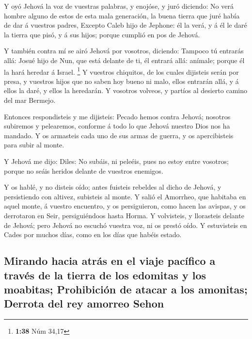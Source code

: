  Y oyó Jehová la voz de vuestras palabras, y enojóse, y
juró diciendo:  No verá hombre alguno de estos de esta mala
generación, la buena tierra que juré había de dar á vuestros padres,
 Excepto Caleb hijo de Jephone: él la verá, y á él le daré
la tierra que pisó, y á sus hijos; porque cumplió en pos de Jehová.

 Y también contra mí se airó Jehová por vosotros, diciendo:
Tampoco tú entrarás allá:  Josué hijo de Nun, que está
delante de ti, él entrará allá: anímale; porque él la hará heredar á
Israel. \footnote{\textbf{1:38} Núm 34,17}  Y vuestros
chiquitos, de los cuales dijisteis serán por presa, y vuestros hijos que
no saben hoy bueno ni malo, ellos entrarán allá, y á ellos la daré, y
ellos la heredarán.  Y vosotros volveos, y partíos al
desierto camino del mar Bermejo.

 Entonces respondisteis y me dijisteis: Pecado hemos contra
Jehová; nosotros subiremos y pelearemos, conforme á todo lo que Jehová
nuestro Dios nos ha mandado. Y os armasteis cada uno de sus armas de
guerra, y os apercibisteis para subir al monte.

 Y Jehová me dijo: Diles: No subáis, ni peleéis, pues no
estoy entre vosotros; porque no seáis heridos delante de vuestros
enemigos.

 Y os hablé, y no disteis oído; antes fuisteis rebeldes al
dicho de Jehová, y persistiendo con altivez, subisteis al monte.
 Y salió el Amorrheo, que habitaba en aquel monte, á
vuestro encuentro, y os persiguieron, como hacen las avispas, y os
derrotaron en Seir, persiguiéndoos hasta Horma.  Y
volvisteis, y llorasteis delante de Jehová; pero Jehová no escuchó
vuestra voz, ni os prestó oído.  Y estuvisteis en Cades por
muchos días, como en los días que habéis estado.

\hypertarget{mirando-hacia-atruxe1s-en-el-viaje-pacuxedfico-a-travuxe9s-de-la-tierra-de-los-edomitas-y-los-moabitas-prohibiciuxf3n-de-atacar-a-los-amonitas-derrota-del-rey-amorreo-sehon}{%
\subsection{Mirando hacia atrás en el viaje pacífico a través de la
tierra de los edomitas y los moabitas; Prohibición de atacar a los
amonitas; Derrota del rey amorreo
Sehon}\label{mirando-hacia-atruxe1s-en-el-viaje-pacuxedfico-a-travuxe9s-de-la-tierra-de-los-edomitas-y-los-moabitas-prohibiciuxf3n-de-atacar-a-los-amonitas-derrota-del-rey-amorreo-sehon}}

